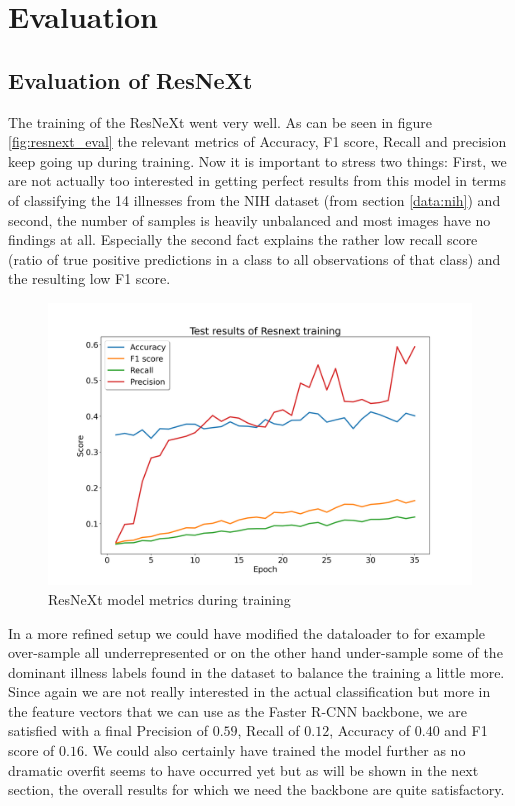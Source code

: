 \chapter{Evaluation}\label{chapter:evaluation}


\section{Evaluation of ResNeXt} \label{chapter:eval_resnext}

The training of the ResNeXt went very well. As can be seen in figure \vref{fig:resnext_eval} the relevant metrics of Accuracy, F1 score, Recall and precision keep going up during training. Now it is important to stress two things: First, we are not actually too interested in getting perfect results from this model in terms of classifying the 14 illnesses from the NIH dataset (from section \vref{data:nih}) and second, the number of samples is heavily unbalanced and most images have no findings at all. Especially the second fact explains the rather low recall score (ratio of true positive predictions in a class to all observations of that class) and the resulting low F1 score.

\begin{figure}[h]
	\centering
	\includegraphics[width=.8\linewidth]{img/test_results_backbone_rcnn_35.png}
	\caption{ResNeXt model metrics during training}
	\label{fig:resnext_eval}
\end{figure}

In a more refined setup we could have modified the dataloader to for example over-sample all underrepresented or on the other hand under-sample some of the dominant illness labels found in the dataset to balance the training a little more. Since again we are not really interested in the actual classification but more in the feature vectors that we can use as the Faster R-CNN backbone, we are satisfied with a final Precision of $0.59$, Recall of $0.12$, Accuracy of $0.40$ and F1 score of $0.16$. We could also certainly have trained the model further as no dramatic overfit seems to have occurred yet but as will be shown in the next section, the overall results for which we need the backbone are quite satisfactory.

